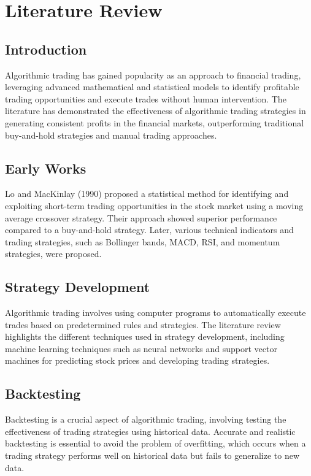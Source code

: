 \chapter{Literature Review}
\label{Chapter2}

\section{Introduction}
Algorithmic trading has gained popularity as an approach to financial trading, leveraging advanced mathematical and statistical models to identify profitable trading opportunities and execute trades without human intervention. The literature has demonstrated the effectiveness of algorithmic trading strategies in generating consistent profits in the financial markets, outperforming traditional buy-and-hold strategies and manual trading approaches.

\section{Early Works}
Lo and MacKinlay (1990) proposed a statistical method for identifying and exploiting short-term trading opportunities in the stock market using a moving average crossover strategy. Their approach showed superior performance compared to a buy-and-hold strategy. Later, various technical indicators and trading strategies, such as Bollinger bands, MACD, RSI, and momentum strategies, were proposed.

\section{Strategy Development}
Algorithmic trading involves using computer programs to automatically execute trades based on predetermined rules and strategies. The literature review highlights the different techniques used in strategy development, including machine learning techniques such as neural networks and support vector machines for predicting stock prices and developing trading strategies.

\section{Backtesting}
Backtesting is a crucial aspect of algorithmic trading, involving testing the effectiveness of trading strategies using historical data. Accurate and realistic backtesting is essential to avoid the problem of overfitting, which occurs when a trading strategy performs well on historical data but fails to generalize to new data.


